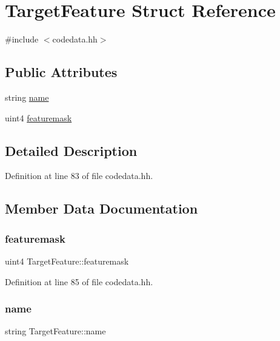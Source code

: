 \hypertarget{struct_target_feature}{}\section{Target\+Feature Struct Reference}
\label{struct_target_feature}


{\ttfamily \#include $<$codedata.\+hh$>$}

\subsection*{Public Attributes}
\begin{DoxyCompactItemize}
\item 
string \mbox{\hyperlink{struct_target_feature_a86b9919cac7a18dc97559b1d1b2c69a3}{name}}
\item 
uint4 \mbox{\hyperlink{struct_target_feature_a53d464667186576f442d0d6d1269a421}{featuremask}}
\end{DoxyCompactItemize}


\subsection{Detailed Description}


Definition at line 83 of file codedata.\+hh.



\subsection{Member Data Documentation}
\mbox{\label{struct_target_feature_a53d464667186576f442d0d6d1269a421}} 
\subsubsection{\texorpdfstring{featuremask}{featuremask}}
{\footnotesize\ttfamily uint4 Target\+Feature\+::featuremask}



Definition at line 85 of file codedata.\+hh.

\mbox{\label{struct_target_feature_a86b9919cac7a18dc97559b1d1b2c69a3}} 
\subsubsection{\texorpdfstring{name}{name}}
{\footnotesize\ttfamily string Target\+Feature\+::name}



